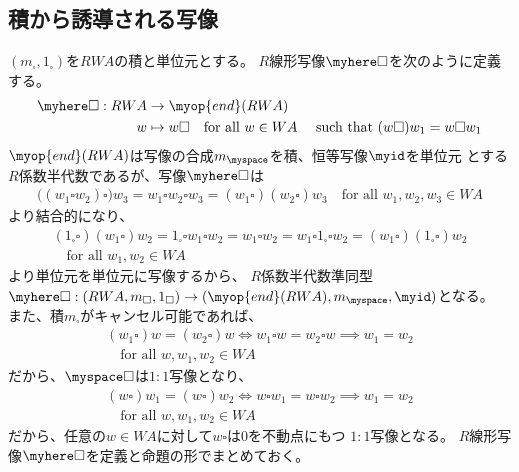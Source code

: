 	\subsection{積から誘導される写像}\label{s2:積から誘導される写像} %
		$(m_\square,1_\square)$を$RWA$の積と単位元とする。
		$R$線形写像$\myhere\square$を次のように定義する。
		\begin{equation*}\begin{split} %
			\myhere\square: RWA&\to \myop{end}(RWA) \\
			w &\mapsto w\square \quad\text{for all }w\in WA\quad\text{ such that }
				(w\square)w_1 = w\square w_1
		\end{split}\end{equation*} %
		$\myop{end}(RWA)$は写像の合成$m_\myspace$を積、恒等写像$\myid$を単位元
		とする$R$係数半代数であるが、写像$\myhere\square$は
		\begin{equation*}\begin{split} %
			\bigl((w_1\square w_2)\square\bigr)w_3 = w_1\square w_2\square w_3 
				= (w_1\square)(w_2\square)w_3 \quad\text{for all }w_1,w_2,w_3\in WA
		\end{split}\end{equation*} %
		より結合的になり、
		\begin{equation*}\begin{split} %
			(1_\square\square)(w_1\square)w_2 = 1_\square\square w_1\square w_2 
			= w_1\square w_2 
			= w_1\square 1_\square\square w_2 = (w_1\square)(1_\square\square)w_2 \\
			\quad\text{for all }w_1,w_2\in WA
		\end{split}\end{equation*} %
		より単位元を単位元に写像するから、
		$R$係数半代数準同型$\myhere\square:(RWA,m_\square,1_\square)
		\to(\myop{end}(RWA),m_\myspace,\myid)$となる。
		また、積$m_\square$がキャンセル可能であれば、
		\begin{equation*}\begin{split} %
			(w_1\square)w = (w_2\square)w
			\Leftrightarrow w_1\square w = w_2\square w
			\implies w_1 = w_2 \\
			\quad\text{for all }w,w_1,w_2\in WA
		\end{split}\end{equation*} %
		だから、$\myspace\square$は$1:1$写像となり、
		\begin{equation*}\begin{split} %
			(w\square)w_1 = (w\square)w_2
			\Leftrightarrow w\square w_1 = w\square w_2
			\implies w_1 = w_2 \\
			\quad\text{for all }w,w_1,w_2\in WA
		\end{split}\end{equation*} %
		だから、任意の$w\in WA$に対して$w\square$は$0$を不動点にもつ
		$1:1$写像となる。
		$R$線形写像$\myhere\square$を定義と命題の形でまとめておく。

